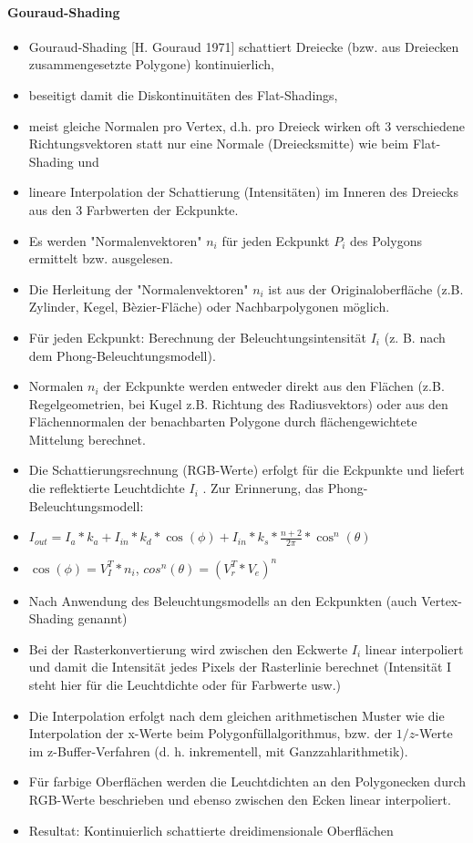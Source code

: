 \documentclass[10pt,landscape]{article}
\begin{document}
\begin{multicols}{3}
{  \paragraph{Gouraud-Shading}
  \begin{itemize}
    \item Gouraud-Shading [H. Gouraud 1971] schattiert Dreiecke (bzw. aus Dreiecken zusammengesetzte Polygone) kontinuierlich,
    \item beseitigt damit die Diskontinuitäten des Flat-Shadings,
    \item meist gleiche Normalen pro Vertex, d.h. pro Dreieck wirken oft 3 verschiedene Richtungsvektoren statt nur eine Normale (Dreiecksmitte) wie beim Flat-Shading und
    \item lineare Interpolation der Schattierung (Intensitäten) im Inneren des Dreiecks aus den 3 Farbwerten der Eckpunkte.
    \item Es werden "Normalenvektoren" $n_i$ für jeden Eckpunkt $P_i$ des Polygons ermittelt bzw. ausgelesen.
    \item Die Herleitung der "Normalenvektoren" $n_i$ ist aus der Originaloberfläche (z.B. Zylinder, Kegel, Bèzier-Fläche) oder Nachbarpolygonen möglich.
    \item Für jeden Eckpunkt: Berechnung der Beleuchtungsintensität $I_i$ (z. B. nach dem Phong-Beleuchtungsmodell).
    \item Normalen $n_i$ der Eckpunkte werden entweder direkt aus den Flächen (z.B. Regelgeometrien, bei Kugel z.B. Richtung des Radiusvektors) oder aus den Flächennormalen der benachbarten Polygone durch flächengewichtete Mittelung berechnet.
    \item Die Schattierungsrechnung (RGB-Werte) erfolgt für die Eckpunkte und liefert die reflektierte Leuchtdichte $I_i$ . Zur Erinnerung, das Phong-Beleuchtungsmodell:
    \item $I_{out}=I_a*k_a+I_{in}*k_d*\cos(\phi)+I_{in}*k_s*\frac{n+2}{2\pi}*\cos^n(\theta)$
    \item $\cos(\phi)=V^T_I*n_i$, $cos^n(\theta)=(V^T_r * V_e)^n$
    \item Nach Anwendung des Beleuchtungsmodells an den Eckpunkten (auch Vertex-Shading genannt)
    \item Bei der Rasterkonvertierung wird zwischen den Eckwerte $I_i$ linear interpoliert und damit die Intensität jedes Pixels der Rasterlinie berechnet (Intensität I steht hier für die Leuchtdichte oder für Farbwerte usw.)
    \item Die Interpolation erfolgt nach dem gleichen arithmetischen Muster wie die Interpolation der x-Werte beim Polygonfüllalgorithmus, bzw. der $1/z$-Werte im z-Buffer-Verfahren (d. h. inkrementell, mit Ganzzahlarithmetik).
    \item Für farbige Oberflächen werden die Leuchtdichten an den Polygonecken durch RGB-Werte beschrieben und ebenso zwischen den Ecken linear interpoliert.
    \item Resultat: Kontinuierlich schattierte dreidimensionale Oberflächen
  \end{itemize}
  
}
\end{multicols}
\end{document}
